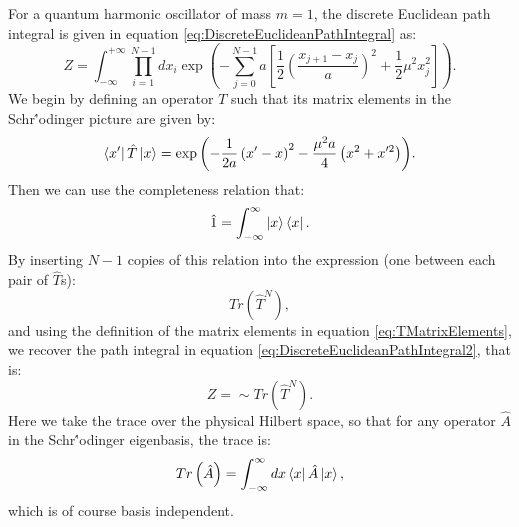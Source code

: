 \documentclass[12pt]{article}
\begin{document}
For a quantum harmonic oscillator of mass $m=1$, the discrete Euclidean path integral is given in equation \ref{eq:DiscreteEuclideanPathIntegral} as:
\begin{equation}
	\label{eq:DiscreteEuclideanPathIntegral2}
	Z = \int^{+\infty}_{-\infty}\prod_{i=1}^{N-1}dx_i \exp{\left(-\sum^{N-1}_{j=0} a \left[\frac{1}{2}\left(\frac{x_{j+1}-x_j}{a}\right)^2+\frac{1}{2}\mu^2x_{j}^2\right]\right)}.
\end{equation}
We begin by defining an operator $T$ such that its matrix elements in the Schr{\''o}dinger picture are given by:
\begin{equation}
	\label{eq:TMatrixElements}
	\bra{x'}\hat{T}\ket{x} = \exp{\left(-\frac{1}{2a}\left(x'-x\right)^2-\frac{\mu^2a}{4}\left(x^2+x'^2\right)\right)}.
\end{equation}
Then we can use the completeness relation that:
\begin{equation}
	\label{eq:CompletenessRelation}
	\hat{1} = \int_{-\infty}^{\infty}\ket{x}\bra{x}.
\end{equation}
By inserting $N-1$ copies of this relation into the expression (one between each pair of $\hat{T}$s):
\begin{equation}
	\label{eq:TraceT}
	Tr\left(\hat{T}^{N}\right),
\end{equation}
and using the definition of the matrix elements in equation \ref{eq:TMatrixElements}, we recover the path integral in equation \ref{eq:DiscreteEuclideanPathIntegral2}, that is:
\begin{equation}
	\label{eq:PathIntegralAsTrace}
	Z = \sim Tr\left(\hat{T}^N\right).
\end{equation}
Here we take the trace over the physical Hilbert space, so that for any operator $\hat{A}$ in the Schr{\''o}dinger eigenbasis, the trace is:
\begin{equation}
	\label{eq:Trace}
	Tr\left(\hat{A}\right) = \int_{-\infty}^{\infty}dx\bra{x}\hat{A}\ket{x},
\end{equation}
which is of course basis independent.
\end{document}
